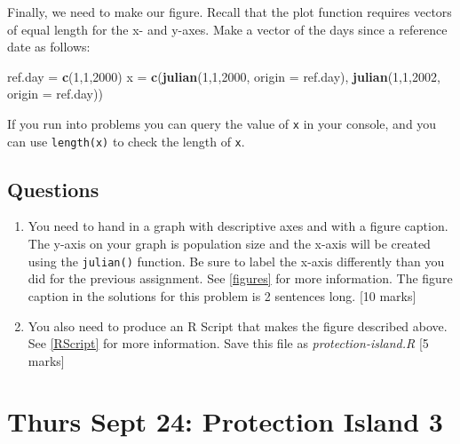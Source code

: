 \documentclass[]{book}
\newenvironment{Shaded}{\begin{snugshade}}{\end{snugshade}}
\newcommand{\KeywordTok}[1]{\textcolor[rgb]{0.13,0.29,0.53}{\textbf{{#1}}}}
\newcommand{\DataTypeTok}[1]{\textcolor[rgb]{0.13,0.29,0.53}{{#1}}}
\newcommand{\DecValTok}[1]{\textcolor[rgb]{0.00,0.00,0.81}{{#1}}}
\newcommand{\StringTok}[1]{\textcolor[rgb]{0.31,0.60,0.02}{{#1}}}
\newcommand{\NormalTok}[1]{{#1}}
\begin{document}
Finally, we need to make our figure. Recall that the plot function
requires vectors of equal length for the x- and y-axes. Make a vector of
the days since a reference date as follows:

\begin{Shaded}
\begin{Highlighting}[]
\NormalTok{ref.day =}\StringTok{ }\KeywordTok{c}\NormalTok{(}\DecValTok{1}\NormalTok{,}\DecValTok{1}\NormalTok{,}\DecValTok{2000}\NormalTok{)}
\NormalTok{x =}\StringTok{ }\KeywordTok{c}\NormalTok{(}\KeywordTok{julian}\NormalTok{(}\DecValTok{1}\NormalTok{,}\DecValTok{1}\NormalTok{,}\DecValTok{2000}\NormalTok{, }\DataTypeTok{origin =} \NormalTok{ref.day), }\KeywordTok{julian}\NormalTok{(}\DecValTok{1}\NormalTok{,}\DecValTok{1}\NormalTok{,}\DecValTok{2002}\NormalTok{, }\DataTypeTok{origin =} \NormalTok{ref.day))}
\end{Highlighting}
\end{Shaded}

If you run into problems you can query the value of \texttt{x} in your
console, and you can use \texttt{length(x)} to check the length of
\texttt{x}.

\section{Questions}\label{questions}

\begin{enumerate}
\def\labelenumi{\arabic{enumi}.}
\item
  You need to hand in a graph with descriptive axes and with a figure
  caption. The y-axis on your graph is population size and the x-axis
  will be created using the \texttt{julian()} function. Be sure to label
  the x-axis differently than you did for the previous assignment. See
  \ref{figures} for more information. The figure caption in the
  solutions for this problem is 2 sentences long. {[}10 marks{]}
\item
  You also need to produce an R Script that makes the figure described
  above. See \ref{RScript} for more information. Save this file as
  \emph{protection-island.R} {[}5 marks{]}
\end{enumerate}

\chapter{Thurs Sept 24: Protection Island
3}\label{thurs-sept-24-protection-island-3}
\end{document}
